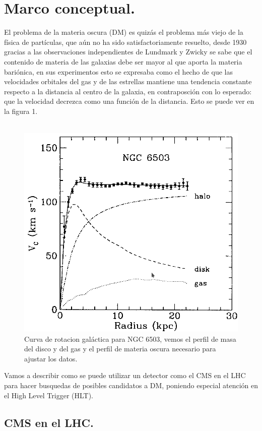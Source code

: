 \section{Marco conceptual.}
El problema de la materia oscura (DM) es quizás el problema más viejo de la física de partículas, que aún no ha sido satisfactoriamente resuelto, desde 1930 gracias a las observaciones independientes de Lundmark y Zwicky se sabe que el contenido de materia de las galaxias debe ser mayor al que aporta la materia bariónica, en sus experimentos esto se expresaba como el hecho de que las velocidades orbitales del gas y de las estrellas mantiene una tendencia constante respecto a la distancia al centro de la galaxia, en contraposción con lo esperado: que la velocidad decrezca como una función de la distancia. Esto se puede ver en la figura 1.
\\
\\
\begin{figure}
\centering
\includegraphics[width=12cm]{F1.png}
\caption{\label{fig:frog} Curva de rotacion galáctica para NGC 6503, vemos el perfil de masa del disco y del gas y el perfil de materia oscura necesario para ajustar los datos.}
\end{figure}
Vamos a describir como se puede utilizar un detector como el CMS en el LHC para hacer busquedas de posibles candidatos a DM, poniendo especial atención en el High Level Trigger (HLT).


\label{sec:examples}

\subsection{CMS en el LHC.}

